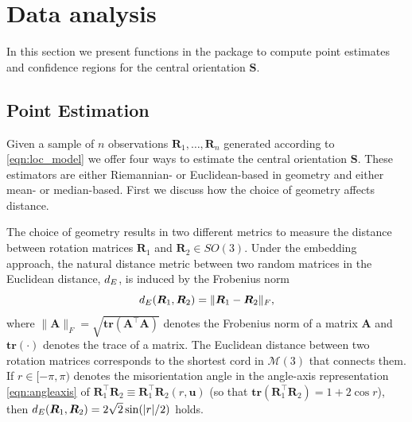 %
%
%

\section{Data analysis\label{section:analysis}}

In this section we present functions in the  package to compute point estimates and confidence regions for the central orientation $\bm S$.

\subsection{Point Estimation}
Given a sample of $n$ observations $\bm R_1,\dots,\bm R_{n}$ generated according to \eqref{eqn:loc_model} we offer four ways to estimate the central orientation $\bm S$.  These estimators are either Riemannian- or Euclidean-based in geometry and either mean- or median-based.  First we discuss how the choice of geometry affects distance.

The choice of geometry results in two different metrics to measure the distance between rotation matrices $\bm{R}_1$ and $\bm{R}_2 \in SO(3)$. Under the embedding approach, the natural distance metric between two random matrices in the Euclidean distance, $d_E$, is induced by the Frobenius norm 
\begin{equation}
\label{d_E}
d_E(\bm{R}_1,\bm{R}_2)=\|\bm{R}_1-\bm{R}_2\|_F, 
\end{equation}
where $\|\bm{A}\|_F = \sqrt{\mathbf{tr}({\bm A^\top \bm A})}$ denotes the Frobenius norm of a matrix $\bm A$ and $\mathbf{tr}(\cdot)$ denotes the trace of a matrix.  The Euclidean distance between two rotation matrices corresponds to the shortest cord in $\mathcal{M}(3)$ that connects them.  If $r\in[-\pi,\pi)$ denotes the misorientation angle in the angle-axis representation \eqref{eqn:angleaxis} of $\bm{R}_1^\top \bm{R}_2 \equiv \bm{R}_1^\top \bm{R}_2(r,\bm{u})$ (so that $\mathbf{tr}(\bm{R}_1^\top \bm{R}_2) =1 +2 \cos r$), then $d_E(\bm{R}_1,\bm{R}_2) = 2\sqrt{2}\sin(|r|/2)$ holds.

